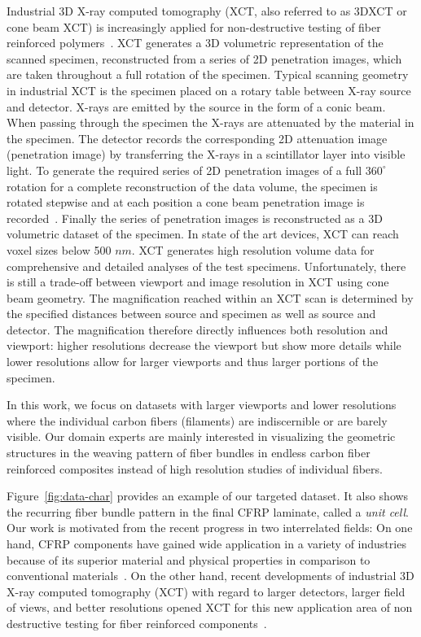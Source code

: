 Industrial 3D X-ray computed tomography (XCT, also referred to as 3DXCT or cone beam XCT) is increasingly applied for non-destructive testing of fiber reinforced polymers~\cite{Kastner2012}. XCT generates a 3D volumetric representation of the scanned specimen, reconstructed from a series of 2D penetration images, which are taken throughout a full rotation of the specimen. Typical scanning geometry in industrial XCT is the specimen placed on a rotary table between X-ray source and detector. X-rays are emitted by the source in the form of a conic beam. When passing through the specimen the X-rays are attenuated by the material in the specimen. The detector records the corresponding 2D attenuation image (penetration image) by transferring the X-rays in a scintillator layer into visible light. To generate the required series of 2D penetration images of a full $360^\circ$ rotation for a complete reconstruction of the data volume, the specimen is rotated stepwise and at each position a cone beam penetration image is recorded~\cite{heinzl-2008-thesis}. Finally the series of penetration images is  reconstructed as a 3D volumetric dataset of the specimen. 
In state of the art devices, XCT can reach voxel sizes below 500 $nm$. XCT generates high resolution volume data for comprehensive and detailed analyses of the test specimens. Unfortunately, there is still a trade-off between viewport and image resolution in XCT using cone beam geometry. The magnification reached within an XCT scan is determined by the specified distances between source and specimen as well as source and detector. The magnification therefore directly influences both resolution and viewport: higher resolutions decrease the viewport but show more details while lower resolutions allow for larger viewports and thus larger portions of the specimen.

In this work, we focus on datasets with larger viewports and lower resolutions where the individual carbon fibers (filaments) are indiscernible or are barely visible. Our domain experts are mainly interested in visualizing the geometric structures in the weaving pattern of fiber bundles in endless carbon fiber reinforced composites instead of high resolution studies of individual fibers.

Figure~\ref{fig:data-char} provides an example of our targeted dataset. It also shows the recurring fiber bundle pattern in the final CFRP laminate, called a \textit{unit cell}.
Our work is motivated from the recent progress in two interrelated fields: On one hand, CFRP components have gained wide application in a variety of industries  because of its superior material and physical properties in comparison to conventional materials~\cite{Karpat2012}. On the other hand, recent developments of industrial 3D X-ray computed tomography (XCT) with regard to larger detectors, larger field of views, and better resolutions opened XCT for this new application area of non destructive testing for fiber reinforced components~\cite{Schilling2005}. 


